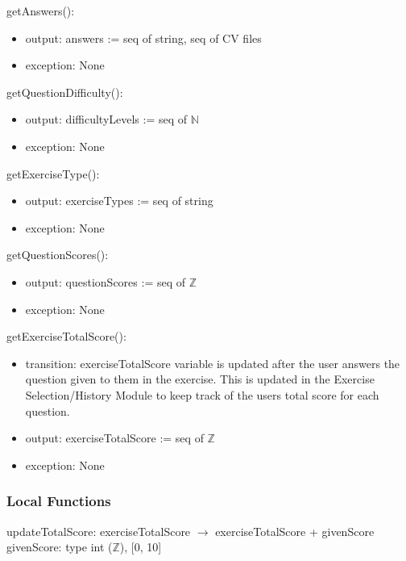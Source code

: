 \documentclass[12pt, titlepage]{article}
\begin{document}
\noindent getAnswers():
\begin{itemize}
\item output: answers := seq of string, seq of CV files
\item exception: None
\end{itemize}

\noindent getQuestionDifficulty():
\begin{itemize}
\item output: difficultyLevels := seq of $\mathbb{N}$
\item exception: None
\end{itemize}

\noindent getExerciseType():
\begin{itemize}
\item output: exerciseTypes := seq of string
\item exception: None
\end{itemize}

\noindent getQuestionScores():
\begin{itemize}
\item output: questionScores := seq of $\mathbb{Z}$
\item exception: None
\end{itemize}

\noindent getExerciseTotalScore():
\begin{itemize}
\item transition: exerciseTotalScore variable is updated after the user answers the question given to them in the exercise. This is updated in the Exercise Selection/History Module to keep track of the users total score for each question. 
\item output: exerciseTotalScore := seq of $\mathbb{Z}$
\item exception: None
\end{itemize}
%
\subsubsection{Local Functions}

updateTotalScore: exerciseTotalScore $\rightarrow$ exerciseTotalScore + givenScore \\
givenScore: type int ($\mathbb{Z}$), [0, 10]


\newpage

\end{document}
